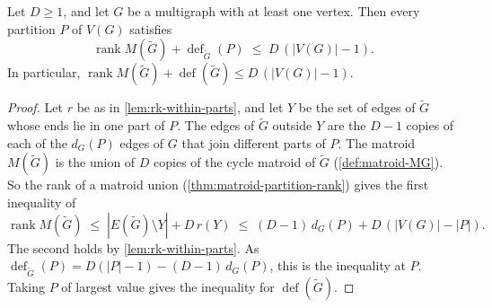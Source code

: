\begin{lemma}
  \label{lem:weak-duality}
  \leanok
  Let $D \ge 1$, and let $G$ be a multigraph with at least one vertex.
  Then every partition $P$ of $V(G)$ satisfies
  \[
    \operatorname{rank} M(\tilde G) + \operatorname{def}_{\tilde G}(P)
      \;\le\; D\,(|V(G)| - 1).
  \]
  In particular,
  $\operatorname{rank} M(\tilde G) + \operatorname{def}(\tilde G) \le
  D\,(|V(G)| - 1)$.
\end{lemma}
\begin{proof}
  \leanok
  Let $r$ be as in \cref{lem:rk-within-parts}, and let $Y$ be the set
  of edges of $\tilde G$ whose ends lie in one part of $P$. The edges of
  $\tilde G$ outside $Y$ are the $D - 1$ copies of each of the $d_G(P)$
  edges of $G$ that join different parts of $P$. The matroid
  $M(\tilde G)$ is the union of $D$ copies of the cycle matroid of
  $\tilde G$ (\cref{def:matroid-MG}). So the rank of a matroid union
  (\cref{thm:matroid-partition-rank}) gives the first inequality of
  \[
    \operatorname{rank} M(\tilde G) \;\le\;
    |E(\tilde G) \setminus Y| + D\,r(Y) \;\le\;
    (D-1)\,d_G(P) + D\,(|V(G)| - |P|).
  \]
  The second holds by \cref{lem:rk-within-parts}. As
  $\operatorname{def}_{\tilde G}(P) = D(|P| - 1) - (D-1)\,d_G(P)$, this
  is the inequality at $P$. Taking $P$ of largest value gives the
  inequality for $\operatorname{def}(\tilde G)$.
\end{proof}

